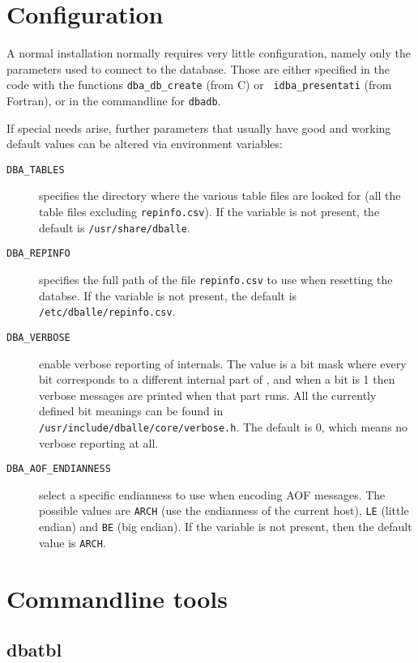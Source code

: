 \section {Configuration}

A normal \dballe{} installation normally requires very little configuration,
namely only the parameters used to connect to the database.  Those are either
specified in the code with the functions {\tt dba\_db\_create} (from C) or {\tt
idba\_presentati} (from Fortran), or in the commandline for {\tt dbadb}.

If special needs arise, further parameters that usually have good and working
default values can be altered via environment variables:

\begin{description}
\item[{\tt DBA\_TABLES}]
  specifies the directory where the various table files are looked for (all the
  table files excluding {\tt repinfo.csv}).  If the variable is not present,
  the default is {\tt /usr/share/dballe}.
\item[{\tt DBA\_REPINFO}]
  specifies the full path of the file {\tt repinfo.csv} to use when resetting
  the databse.  If the variable is not present, the default is
  {\tt /etc/dballe/repinfo.csv}.
\item[{\tt DBA\_VERBOSE}]
  enable verbose reporting of \dballe{} internals.  The value is a bit mask
  where every bit corresponds to a different internal part of \dballe{}, and
  when a bit is 1 then verbose messages are printed when that part runs.  All
  the currently defined bit meanings can be found in
  {\tt /usr/include/dballe/core/verbose.h}.  The default is 0, which means no
  verbose reporting at all.
\item[{\tt DBA\_AOF\_ENDIANNESS}]
  select a specific endianness to use when encoding AOF messages.  The possible
  values are {\tt ARCH} (use the endianness of the current host), {\tt LE}
  (little endian) and {\tt BE} (big endian).  If the variable is not present,
  then the default value is {\tt ARCH}.
\end{description}


\section {Commandline tools}

\subsection{dbatbl}

